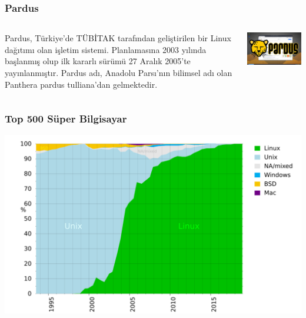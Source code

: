 \documentclass[english,svgnames,notes=hide,12pt]{beamer}
\begin{document}
\begin{frame}
\frametitle{Pardus}
\begin{columns}
\begin{column}{0.5\textwidth}
Pardus, Türkiye'de TÜBİTAK tarafından geliştirilen bir Linux dağıtımı olan işletim sistemi. Planlamasına 2003 yılında başlanmış olup ilk kararlı sürümü 27 Aralık 2005’te yayınlanmıştır. Pardus adı, Anadolu Parsı'nın bilimsel adı olan Panthera pardus tulliana'dan gelmektedir.
\end{column}

\begin{column}{0.5\textwidth}
\includegraphics[width=1.0\textwidth]{imgs/pardusl}
\end{column}

\end{columns}

\end{frame}







\begin{frame}
\frametitle{Top 500 Süper Bilgisayar}
\includegraphics[width=1.0\textwidth]{imgs/top500}

\end{frame}
\end{document}
